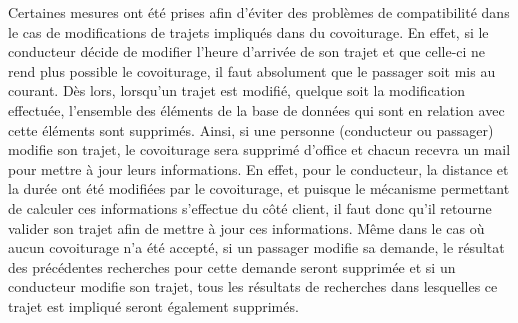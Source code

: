 \documentclass[12pt, a4paper, oneside]{article}
\begin{document}
        \indent Certaines mesures ont été prises afin d'éviter des problèmes de compatibilité dans le cas de modifications de trajets impliqués dans du covoiturage. En effet, si le conducteur décide de modifier l'heure d'arrivée de son trajet et que celle-ci ne rend plus possible le covoiturage, il faut absolument que le passager soit mis au courant. Dès lors, lorsqu'un trajet est modifié, quelque soit la modification effectuée, l'ensemble des éléments de la base de données qui sont en relation avec cette éléments sont supprimés. Ainsi, si une personne (conducteur ou passager) modifie son trajet, le covoiturage sera supprimé d'office et chacun recevra un mail pour mettre à jour leurs informations. En effet, pour le conducteur, la distance et la durée ont été modifiées par le covoiturage, et puisque le mécanisme permettant de calculer ces informations s'effectue du côté client, il faut donc qu'il retourne valider son trajet afin de mettre à jour ces informations. Même dans le cas où aucun covoiturage n'a été accepté, si un passager modifie sa demande, le résultat des précédentes recherches pour cette demande seront supprimée et si un conducteur modifie son trajet, tous les résultats de recherches dans lesquelles ce trajet est impliqué seront également supprimés.
\end{document}
